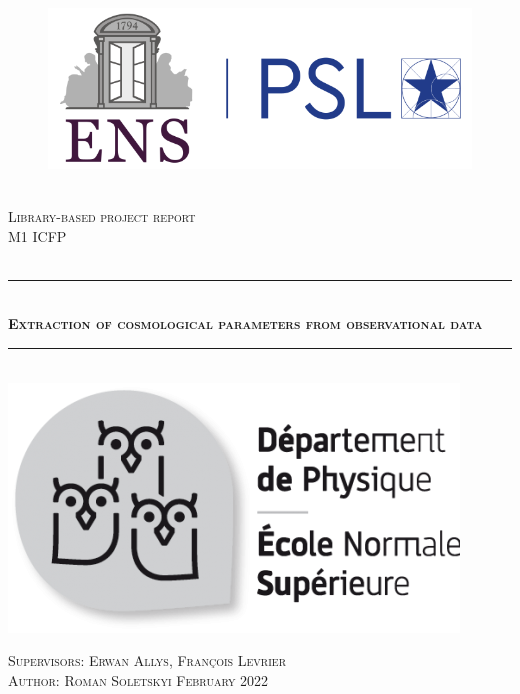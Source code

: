 \documentclass[12pt]{extarticle}
\numberwithin{problem}{section}
\numberwithin{theorem}{section}
\newcommand{\HRule}{\rule{\linewidth}{0.5mm}}
\begin{document}
	
	\begin{titlepage}
		
		\begin{sffamily}
			\centering
			\begin{figure}
				\centering
				\includegraphics[scale=0.38]{FIG0(1)(1).png}~\\[3cm]
				\label{ENS}
			\end{figure}
			\centering
			\textsc{\LARGE Library-based project report}\\[0.5cm]
			\textsc{\LARGE M1 ICFP}\\[0.5cm]
			
			\textsc{\LARGE }\\[0.5cm]
			
			\begin{center}
				
				\HRule \\[0.4cm]
				\textsc{ \huge \bfseries Extraction of cosmological parameters from observational data}
				\HRule \\[1.0cm]
				\href{http://www.phys.ens.fr/}{\includegraphics[scale=0.40]{FIG(1)(1).png}}\vspace*{0.5cm} \hspace*{1.5cm}
			\end{center}
			
			\begin{center}
				\textsc{Supervisors: Erwan Allys, François Levrier}\\
				\textsc{Author: Roman Soletskyi}
				\vfill
				{\textsc{ \large February 2022}}
				
			\end{center}
		\end{sffamily}
	\end{titlepage}
	
\end{document}
